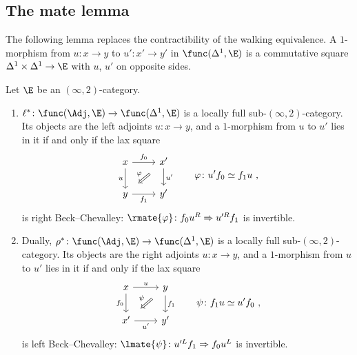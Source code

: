 \subsection{The mate lemma}
\label{subsec:2dloc-mates}

The following lemma replaces the contractibility of the walking equivalence.
A $1$-morphism from $u\colon x \to y$ to $u'\colon x' \to y'$ in $\func(\Delta^{1},\E)$ is a commutative square $\Delta^{1} \times \Delta^{1} \to \E$ with $u$, $u'$ on opposite sides.

\begin{lem}[mates]
\label{lem:mates}
Let $\E$ be an $(\infty,2)$-category.
\begin{enumerate}
\item $\ell^{*}\colon \func(\Adj,\E) \to \func(\Delta^{1},\E)$ is a locally full sub-$(\infty,2)$-category. Its objects are the left adjoints $u\colon x \to y$, and a $1$-morphism from $u$ to $u'$ lies in it if and only if the lax square
\[
\begin{tikzcd}
x \ar[r, "f_{0}"] \ar[d, "u"'] & x' \ar[d, "u'"] \ar[dl, Rightarrow, shorten=3mm, "\varphi"'] \\
y \ar[r, "f_{1}"'] & y'
\end{tikzcd}
\qquad \varphi\colon u'f_{0} \simeq f_{1}u \ ,
\]
is right Beck--Chevalley: $\rmate{\varphi}\colon f_{0}u^{R} \Rightarrow u'^{R}f_{1}$ is invertible.
\item Dually, $\rho^{*}\colon \func(\Adj,\E) \to \func(\Delta^{1},\E)$ is a locally full sub-$(\infty,2)$-category. Its objects are the right adjoints $u\colon x \to y$, and a $1$-morphism from $u$ to $u'$ lies in it if and only if the lax square
\[
\begin{tikzcd}
x \ar[r, "u"] \ar[d, "f_{0}"'] & y \ar[d, "f_{1}"] \ar[dl, Rightarrow, shorten=3mm, "\psi"'] \\
x' \ar[r, "u'"'] & y'
\end{tikzcd}
\qquad \psi\colon f_{1}u \simeq u'f_{0} \ ,
\]
is left Beck--Chevalley: $\lmate{\psi}\colon u'^{L}f_{1} \Rightarrow f_{0}u^{L}$ is invertible.
\end{enumerate}
\end{lem}

